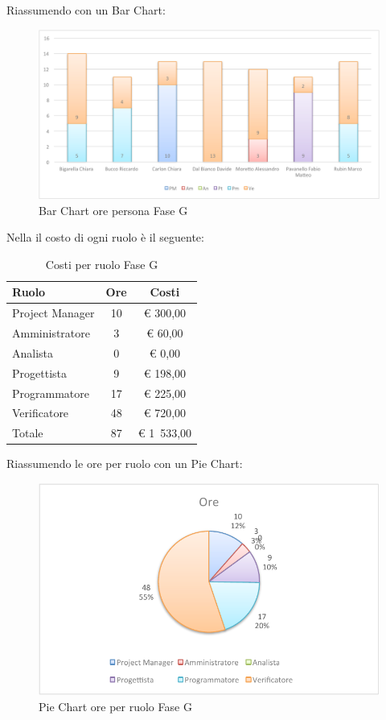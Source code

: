 				Riassumendo con un Bar Chart:
				\begin{figure}[H]\centering
					\includegraphics[width=\textwidth]{PianoDiProgetto/Pics/ChartOreFaseG.pdf}
					\caption{Bar Chart ore persona Fase G}
				\end{figure}
				Nella  il costo di ogni ruolo è il seguente:
				\begin{table}[H]
					\begin{center}
						\begin{tabular}{| l | c | c |}
							\hline
							Ruolo 			& Ore 	& Costi  \\ \hline
							
							Project Manager	& 10 		& \euro{} 300,00 	\\
							Amministratore 		& 3 		& \euro{} 60,00 	\\
							Analista	 		& 0		& \euro{} 0,00	\\
							Progettista 		& 9 		& \euro{} 198,00  	\\
							Programmatore		& 17 		& \euro{} 225,00 	\\
							Verificatore		& 48 		& \euro{} 720,00 	\\ \hline \hline
							
							Totale	 		& 87 		& \euro{} 1~533,00 	\\ \hline
						\end{tabular}
					\end{center}
					\caption{Costi per ruolo Fase G}
				\end{table}
				Riassumendo le ore per ruolo con un Pie Chart:
				\begin{figure}[H]\centering
					\includegraphics[width=\textwidth]{PianoDiProgetto/Pics/ChartTotOreFaseG.pdf}
					\caption{Pie Chart ore per ruolo Fase G}
				\end{figure}

